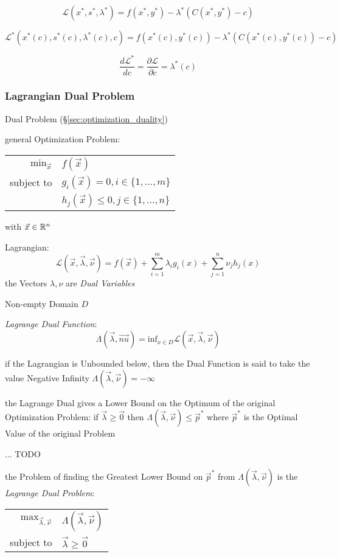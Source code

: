 \[
  \mathcal{L}(x^*,s^*,\lambda^*) = f(x^*,y^*) - \lambda^*(C(x^*,y^*)-c)
\]

\[
  \mathcal{L}^*(x^*(c),s^*(c),\lambda^*(c), c)
    = f(x^*(c),y^*(c)) - \lambda^*(C(x^*(c),y^*(c))-c)
\]

\[
  \frac{d\mathcal{L}^*}{dc} = \frac{\partial{\mathcal{L}}}{\partial{c}} =
  \lambda^*(c)
\]



\subsubsection{Lagrangian Dual Problem}\label{sec:lagrangian_dual}

Dual Problem (\S\ref{sec:optimization_duality})

general Optimization Problem:

\begin{tabular}{r l}
  $\mathrm{min}_{\vec{x}}$ & $f(\vec{x})$      \\
  subject to               & $g_i(\vec{x}) = 0, i \in \{1,\ldots,m\}$ \\
                           & $h_j(\vec{x}) \leq 0, j \in \{1,\ldots,n\}$
\end{tabular}

with $\vec{x} \in \mathbb{R}^n$

Lagrangian:
\[
  \mathcal{L}(\vec{x},\vec{\lambda},\vec{\nu}) =
    f(\vec{x}) + \sum_{i=1}^m\lambda_i g_i(x) + \sum_{j=1}^n \nu_j h_j(x)
\]
the Vectors $\lambda, \nu$ are \emph{Dual Variables}

Non-empty Domain $D$

\emph{Lagrange Dual Function}:
\[
  \Lambda(\vec{\lambda}, \vec{nu}) =
    \mathrm{inf}_{x \in D} \mathcal{L}(\vec{x},\vec{\lambda},\vec{\nu})
\]

if the Lagrangian is Unbounded below, then the Dual Function is said to take
the value Negative Infinity $\Lambda(\vec{\lambda}, \vec{\nu}) = -\infty$

the Lagrange Dual gives a Lower Bound on the Optimum of the original
Optimization Problem: if $\vec{\lambda} \geq \vec{0}$ then
$\Lambda(\vec{\lambda}, \vec{\nu}) \leq \vec{p}^*$ where $\vec{p}^*$ is the
Optimal Value of the original Problem

... TODO

the Problem of finding the Greatest Lower Bound on $\vec{p}^*$ from
$\Lambda(\vec{\lambda},\vec{\nu})$ is the \emph{Lagrange Dual Problem}:
\begin{tabular}{r l}
  $\mathrm{max}_{\vec{\lambda},\vec{\nu}}$ &
    $\Lambda(\vec{\lambda},\vec{\nu})$ \\
  subject to & $\vec{\lambda} \geq \vec{0}$ \\
\end{tabular}

